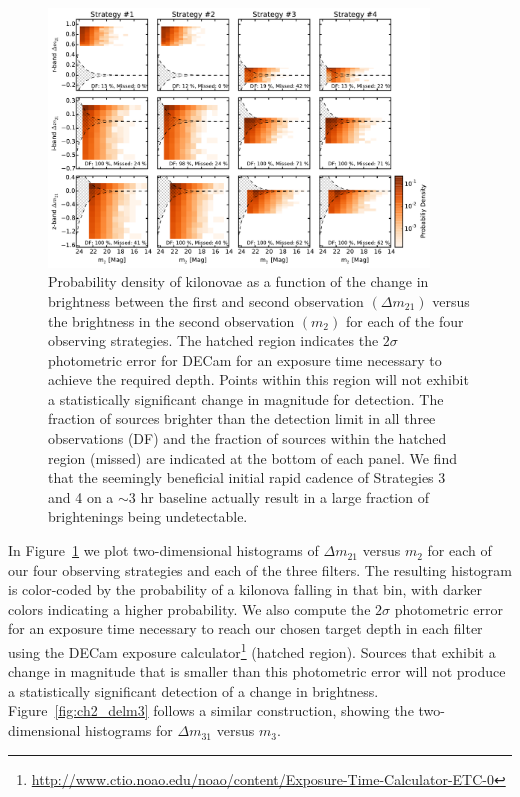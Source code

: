 \begin{figure}[t!]
\centering
\includegraphics[width=0.9\textwidth]{./figs/chapter2/ch2_f6.pdf}
\caption{Probability density of kilonovae as a function of the change in brightness between the first and second observation $(\Delta m_21)$ versus the brightness in the second observation $(m_2)$ for each of the four observing strategies. The hatched region indicates the $2\sigma$ photometric error for DECam for an exposure time necessary to achieve the required depth. Points within this region will not exhibit a statistically significant change in magnitude for detection. The fraction of sources brighter than the detection limit in all three observations (DF) and the fraction of sources within the hatched region (missed) are indicated at the bottom of each panel. We find that the seemingly beneficial initial rapid cadence of Strategies 3 and 4 on a $\sim$3 hr baseline actually result in a large fraction of brightenings being undetectable.}
\label{fig:ch2_delm2}
\end{figure}

In Figure~\ref{fig:ch2_delm2} we plot two-dimensional histograms of $\Delta m_{21}$ versus $m_2$ for each of our four observing strategies and each of the three filters. The resulting histogram is color-coded by the probability of a kilonova falling in that bin, with darker colors indicating a higher probability. We also compute the $2\sigma$ photometric error for an exposure time necessary to reach our chosen target depth in each filter using the DECam exposure calculator\footnote{\url{http://www.ctio.noao.edu/noao/content/Exposure-Time-Calculator-ETC-0}} (hatched region). Sources that exhibit a change in magnitude that is smaller than this photometric error will not produce a statistically significant detection of a change in brightness. Figure~\ref{fig:ch2_delm3} follows a similar construction, showing the two-dimensional histograms for $\Delta m_{31}$ versus $m_3$.

